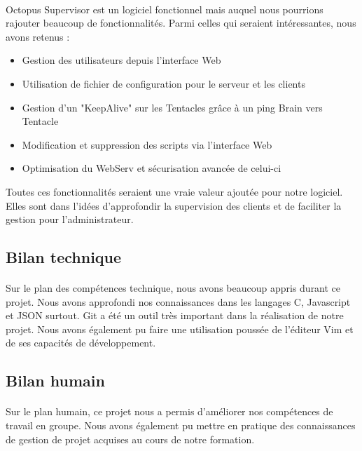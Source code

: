 \paragraph{}
Octopus Supervisor est un logiciel fonctionnel mais auquel nous pourrions rajouter beaucoup de fonctionnalités. Parmi celles qui seraient intéressantes, nous avons retenus :
\begin{itemize}
 \item Gestion des utilisateurs depuis l'interface Web
 \item Utilisation de fichier de configuration pour le serveur et les clients
 \item Gestion d'un "KeepAlive" sur les Tentacles grâce à un ping Brain vers Tentacle
 \item Modification et suppression des scripts via l'interface Web
 \item Optimisation du WebServ et sécurisation avancée de celui-ci
\end{itemize}
Toutes ces fonctionnalités seraient une vraie valeur ajoutée pour notre logiciel. Elles sont dans l'idées d'approfondir la supervision des clients et de faciliter la gestion pour l'administrateur.

\subsection{Bilan technique}
\paragraph{}
Sur le plan des compétences technique, nous avons beaucoup appris durant ce projet. Nous avons approfondi nos connaissances dans les langages C, Javascript et JSON surtout. Git a été un outil très important dans la réalisation de notre projet.
Nous avons également pu faire une utilisation poussée de l'éditeur Vim et de ses capacités de développement.

\subsection{Bilan humain}
\paragraph{}
Sur le plan humain, ce projet nous a permis d'améliorer nos compétences de travail en groupe. Nous avons également pu mettre en pratique des connaissances de gestion de projet acquises au cours de notre formation.
